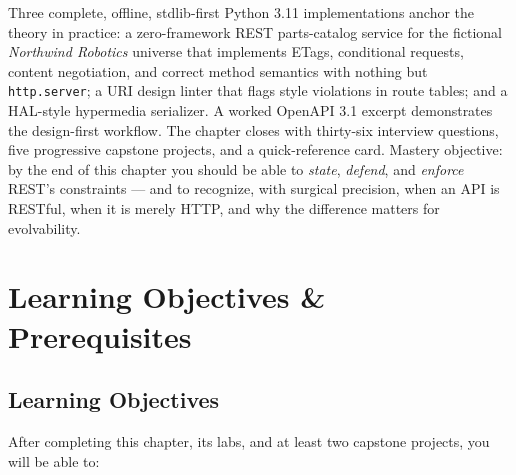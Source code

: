 Three complete, offline, stdlib-first Python 3.11 implementations anchor the theory
in practice: a zero-framework REST parts-catalog service for the fictional
\emph{Northwind Robotics} universe that implements ETags, conditional requests,
content negotiation, and correct method semantics with nothing but
\texttt{http.server}; a URI design linter that flags style violations in route
tables; and a HAL-style hypermedia serializer. A worked OpenAPI 3.1 excerpt
\cite{openapi31} demonstrates the design-first workflow. The chapter closes with
thirty-six interview questions, five progressive capstone projects, and a
quick-reference card. Mastery objective: by the end of this chapter you should be
able to \emph{state}, \emph{defend}, and \emph{enforce} REST's constraints --- and
to recognize, with surgical precision, when an API is RESTful, when it is merely
HTTP, and why the difference matters for evolvability.

\section{Learning Objectives \& Prerequisites}
\label{sec:ch3-objectives}

\subsection*{Learning Objectives}

After completing this chapter, its labs, and at least two capstone projects, you
will be able to:

